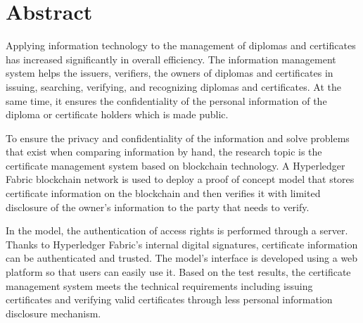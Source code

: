 \chapter*{Abstract}
Applying information technology to the management of diplomas and certificates has increased significantly in overall efficiency. The information management system helps the issuers, verifiers, the owners of diplomas and certificates in issuing, searching, verifying, and recognizing diplomas and certificates. At the same time, it ensures the confidentiality of the personal information of the diploma or certificate holders which is made public.

To ensure the privacy and confidentiality of the information and solve problems that exist when comparing information by hand, the research topic is the certificate management system based on blockchain technology. A Hyperledger Fabric blockchain network is used to deploy a proof of concept model that stores certificate information on the blockchain and then verifies it with limited disclosure of the owner’s information to the party that needs to verify.

In the model, the authentication of access rights is performed through a server. Thanks to Hyperledger Fabric's internal digital signatures, certificate information can be authenticated and trusted. The model’s interface is developed using a web platform so that users can easily use it. Based on the test results, the certificate management system meets the technical requirements including issuing certificates and verifying valid certificates through less personal information disclosure mechanism.
